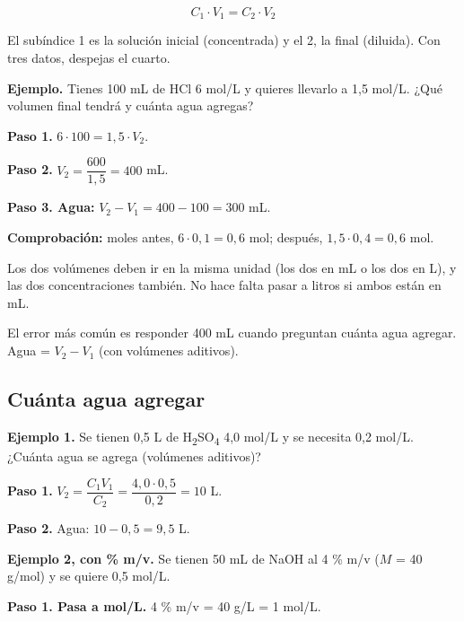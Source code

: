  \[ C_1 \cdot V_1 = C_2 \cdot V_2 \] 

El subíndice 1 es la solución inicial (concentrada) y el 2, la final (diluida). Con tres datos, despejas el cuarto.

 

\textbf{Ejemplo.} Tienes 100 mL de HCl 6 mol/L y quieres llevarlo a 1,5 mol/L. ¿Qué volumen final tendrá y cuánta agua agregas?

 

\textbf{Paso 1.} $6 \cdot 100 = 1{,}5 \cdot V_2$.

 

\textbf{Paso 2.} $V_2 = \dfrac{600}{1{,}5} = 400$ mL.

 

\textbf{Paso 3. Agua:} $V_2 - V_1 = 400 - 100 = 300$ mL.

 

\textbf{Comprobación:} moles antes, $6 \cdot 0{,}1 = 0{,}6$ mol; después, $1{,}5 \cdot 0{,}4 = 0{,}6$ mol. 

  
\begin{clave}[{Unidades}] Los dos volúmenes deben ir en la misma unidad (los dos en mL o los dos en L), y las dos concentraciones también. No hace falta pasar a litros si ambos están en mL.\end{clave}
 
\begin{ojo} El error más común es responder 400 mL cuando preguntan cuánta agua agregar. Agua = $V_2 - V_1$ (con volúmenes aditivos).\end{ojo}
\subsection{Cuánta agua agregar}
\textbf{Ejemplo 1.} Se tienen 0,5 L de H\textsubscript{2}SO\textsubscript{4} 4,0 mol/L y se necesita 0,2 mol/L. ¿Cuánta agua se agrega (volúmenes aditivos)?

 

\textbf{Paso 1.} $V_2 = \dfrac{C_1 V_1}{C_2} = \dfrac{4{,}0 \cdot 0{,}5}{0{,}2} = 10$ L.

 

\textbf{Paso 2.} Agua: $10 - 0{,}5 = 9{,}5$ L.

 

\textbf{Ejemplo 2, con \% m/v.} Se tienen 50 mL de NaOH al 4 \% m/v ($M$ = 40 g/mol) y se quiere 0,5 mol/L.

 

\textbf{Paso 1. Pasa a mol/L.} 4 \% m/v = 40 g/L = 1 mol/L.

